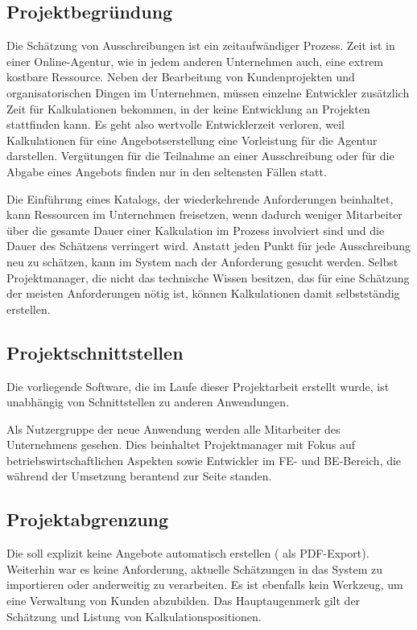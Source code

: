 \subsection{Projektbegründung}
\label{sec:Projektbegruendung}
Die Schätzung von Ausschreibungen ist ein zeitaufwändiger Prozess. Zeit ist in
einer Online-Agentur, wie in jedem anderen Unternehmen auch, eine extrem
kostbare Ressource. Neben der Bearbeitung von Kundenprojekten und
organisatorischen Dingen im Unternehmen, müssen einzelne Entwickler zusätzlich
Zeit für Kalkulationen bekommen, in der keine Entwicklung an Projekten
stattfinden kann.
Es geht also wertvolle Entwicklerzeit verloren, weil Kalkulationen für eine
Angebotserstellung eine Vorleistung für die Agentur darstellen. Vergütungen
für die Teilnahme an einer Ausschreibung oder für die Abgabe eines Angebots
finden nur in den seltensten Fällen statt.

Die Einführung eines Katalogs, der wiederkehrende Anforderungen beinhaltet, kann
Ressourcen im Unternehmen freisetzen, wenn dadurch weniger Mitarbeiter über die
gesamte Dauer einer Kalkulation im Prozess involviert sind und die Dauer des
Schätzens verringert wird. Anstatt jeden Punkt für jede Ausschreibung neu zu
schätzen, kann im System nach der Anforderung gesucht werden. Selbst
Projektmanager, die nicht das technische Wissen besitzen, das für eine Schätzung
der meisten Anforderungen nötig ist, können Kalkulationen damit selbstständig
erstellen.

\subsection{Projektschnittstellen}
\label{sec:Projektschnittstellen}
Die vorliegende Software, die im Laufe dieser Projektarbeit erstellt wurde, ist
unabhängig von Schnittstellen zu anderen Anwendungen. 

Als Nutzergruppe der neue Anwendung werden alle Mitarbeiter des Unternehmens
gesehen. Dies beinhaltet Projektmanager mit Fokus auf betriebswirtschaftlichen
Aspekten sowie Entwickler im \acs{FE}- und \acs{BE}-Bereich, die während der
Umsetzung berantend zur Seite standen.

\subsection{Projektabgrenzung}
\label{sec:Projektabgrenzung}
Die {\untertitel} soll explizit keine Angebote automatisch erstellen (\zB
als \acs{PDF}-Export). Weiterhin war es keine Anforderung, aktuelle Schätzungen
in das System zu importieren oder anderweitig zu verarbeiten. Es ist ebenfalls
kein Werkzeug, um eine Verwaltung von Kunden abzubilden. Das Hauptaugenmerk gilt
der Schätzung und Listung von Kalkulationspositionen.
